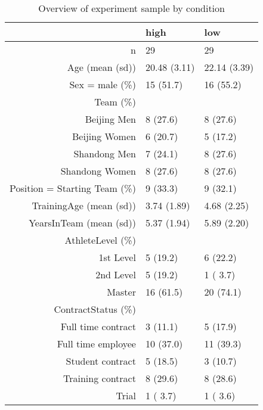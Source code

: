 \begin{table}[ht]
\centering
\begin{tabular}{rll}
  \hline
 & high & low \\ 
  \hline
n &    29 &    29 \\ 
  Age (mean (sd)) & 20.48 (3.11) & 22.14 (3.39) \\ 
  Sex = male (\%) &    15 (51.7)  &    16 (55.2)  \\ 
  Team (\%) &     &     \\ 
     Beijing Men &     8 (27.6)  &     8 (27.6)  \\ 
     Beijing Women &     6 (20.7)  &     5 (17.2)  \\ 
     Shandong Men &     7 (24.1)  &     8 (27.6)  \\ 
     Shandong Women &     8 (27.6)  &     8 (27.6)  \\ 
  Position = Starting Team (\%) &     9 (33.3)  &     9 (32.1)  \\ 
  TrainingAge (mean (sd)) &  3.74 (1.89) &  4.68 (2.25) \\ 
  YearsInTeam (mean (sd)) &  5.37 (1.94) &  5.89 (2.20) \\ 
  AthleteLevel (\%) &     &     \\ 
     1st Level &     5 (19.2)  &     6 (22.2)  \\ 
     2nd Level &     5 (19.2)  &     1 ( 3.7)  \\ 
     Master &    16 (61.5)  &    20 (74.1)  \\ 
  ContractStatus (\%) &     &     \\ 
     Full time contract &     3 (11.1)  &     5 (17.9)  \\ 
     Full time employee &    10 (37.0)  &    11 (39.3)  \\ 
     Student contract &     5 (18.5)  &     3 (10.7)  \\ 
     Training contract &     8 (29.6)  &     8 (28.6)  \\ 
     Trial &     1 ( 3.7)  &     1 ( 3.6)  \\ 
   \hline
\end{tabular}
\caption{Overview of experiment sample by condition} 
\label{tab:athleteDescriptivesConditionTraining}
\end{table}
